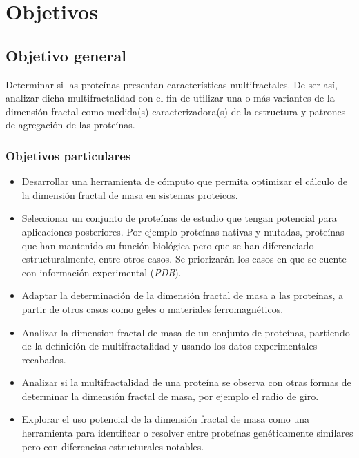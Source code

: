 \chapter{Objetivos}
\section{Objetivo general}


Determinar si las prote\'{i}nas presentan caracter\'{i}sticas multifractales. De ser as\'{i}, analizar dicha multifractalidad con el fin de utilizar una o m\'{a}s variantes de la
dimensi\'{o}n fractal como medida(s) caracterizadora(s)
de la estructura y patrones de agregaci\'{o}n de las prote\'{i}nas.



\subsection{Objetivos particulares}

\begin{itemize}

\item Desarrollar una herramienta de c\'{o}mputo que permita optimizar el c\'{a}lculo de la dimensi\'{o}n fractal de masa en sistemas proteicos.

\item Seleccionar un conjunto de prote\'{i}nas de estudio que tengan potencial para aplicaciones posteriores. Por ejemplo prote\'{i}nas nativas y mutadas, prote\'{i}nas que han mantenido su funci\'{o}n biol\'{o}gica pero que se han diferenciado estructuralmente, entre otros casos. Se priorizar\'{a}n los casos en que se cuente con informaci\'{o}n
experimental (\textit{PDB}).

\item Adaptar la determinaci\'{o}n de la dimensi\'{o}n fractal de masa a las prote\'{i}nas, a partir de otros casos como geles o materiales ferromagn\'{e}ticos.

\item Analizar la dimension fractal de masa de un conjunto de prote\'{i}nas, partiendo de la definici\'{o}n de multifractalidad y usando los datos experimentales recabados.

\item Analizar si la multifractalidad de una prote\'{i}na se observa con otras formas de determinar la dimensi\'{o}n fractal de masa, por ejemplo el radio de giro.

\item Explorar el uso potencial de la dimensi\'{o}n fractal de masa como una herramienta para identificar o resolver entre prote\'{i}nas gen\'{e}ticamente similares pero con diferencias estructurales notables.

\end{itemize}
